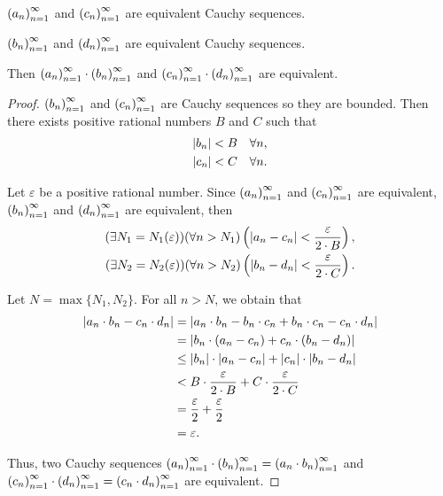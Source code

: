 \begin{theorem}
    ${\left({a_{n}}\right)}^{\infty}_{n=1}$ and ${\left({c_{n}}\right)}^{\infty}_{n=1}$ are equivalent Cauchy sequences.

    ${\left({b_{n}}\right)}^{\infty}_{n=1}$ and ${\left({d_{n}}\right)}^{\infty}_{n=1}$ are equivalent Cauchy sequences.

    Then ${\left({a_{n}}\right)}^{\infty}_{n=1}\cdot{\left({b_{n}}\right)}^{\infty}_{n=1}$ and ${\left({c_{n}}\right)}^{\infty}_{n=1}\cdot{\left({d_{n}}\right)}^{\infty}_{n=1}$ are equivalent.
\end{theorem}

\begin{proof}
    ${\left({b_{n}}\right)}^{\infty}_{n=1}$  and ${\left({c_{n}}\right)}^{\infty}_{n=1}$ are Cauchy sequences so they are bounded. Then there exists positive rational numbers $B$ and $C$ such that
    \[
        \begin{split}
            \left\vert{b_{n}}\right\vert < B\quad\forall n, \\
            \left\vert{c_{n}}\right\vert < C\quad\forall n.
        \end{split}
    \]

    Let $\varepsilon$ be a positive rational number. Since ${\left({a_{n}}\right)}^{\infty}_{n=1}$ and ${\left({c_{n}}\right)}^{\infty}_{n=1}$ are equivalent, ${\left({b_{n}}\right)}^{\infty}_{n=1}$ and ${\left({d_{n}}\right)}^{\infty}_{n=1}$ are equivalent, then
    \[
        \begin{split}
            (\exists N_{1}=N_{1}(\varepsilon))(\forall n > N_{1})\left(\left\vert{a_{n} - c_{n}}\right\vert < \frac{\varepsilon}{2\cdot B}\right), \\
            (\exists N_{2}=N_{2}(\varepsilon))(\forall n > N_{2})\left(\left\vert{b_{n} - d_{n}}\right\vert < \frac{\varepsilon}{2\cdot C}\right).
        \end{split}
    \]

    Let $N = \max\{ N_{1}, N_{2} \}$. For all $n > N$, we obtain that
    \begin{align*}
        \left\vert{a_{n}\cdot b_{n} - c_{n}\cdot d_{n}}\right\vert & = \left\vert{a_{n}\cdot b_{n} - b_{n}\cdot c_{n} + b_{n}\cdot c_{n} - c_{n}\cdot d_{n}}\right\vert \\
                                                  & = \left\vert{b_{n}\cdot (a_{n} - c_{n}) + c_{n}\cdot (b_{n} - d_{n})}\right\vert                   \\
                                                  & \le \left\vert{b_{n}}\right\vert\cdot\left\vert{a_{n} - c_{n}}\right\vert + \left\vert{c_{n}}\right\vert\cdot\left\vert{b_{n} - d_{n}}\right\vert     \\
                                                  & < B\cdot\frac{\varepsilon}{2\cdot B} + C\cdot\frac{\varepsilon}{2\cdot C}         \\
                                                  & = \frac{\varepsilon}{2} + \frac{\varepsilon}{2}                                   \\
                                                  & = \varepsilon.
    \end{align*}

    Thus, two Cauchy sequences ${\left({a_{n}}\right)}^{\infty}_{n=1}\cdot{\left({b_{n}}\right)}^{\infty}_{n=1} = {\left({a_{n}\cdot b_{n}}\right)}^{\infty}_{n=1}$ and ${\left({c_{n}}\right)}^{\infty}_{n=1}\cdot{\left({d_{n}}\right)}^{\infty}_{n=1} = {\left({c_{n}\cdot d_{n}}\right)}^{\infty}_{n=1}$ are equivalent.
\end{proof}

